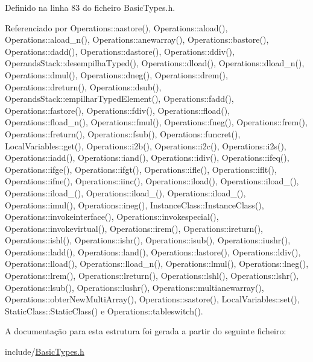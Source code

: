 Definido na linha 83 do ficheiro Basic\+Types.\+h.



Referenciado por Operations\+::aastore(), Operations\+::aload(), Operations\+::aload\+\_\+n(), Operations\+::anewarray(), Operations\+::bastore(), Operations\+::dadd(), Operations\+::dastore(), Operations\+::ddiv(), Operands\+Stack\+::desempilha\+Typed(), Operations\+::dload(), Operations\+::dload\+\_\+n(), Operations\+::dmul(), Operations\+::dneg(), Operations\+::drem(), Operations\+::dreturn(), Operations\+::dsub(), Operands\+Stack\+::empilhar\+Typed\+Element(), Operations\+::fadd(), Operations\+::fastore(), Operations\+::fdiv(), Operations\+::fload(), Operations\+::fload\+\_\+n(), Operations\+::fmul(), Operations\+::fneg(), Operations\+::frem(), Operations\+::freturn(), Operations\+::fsub(), Operations\+::funcret(), Local\+Variables\+::get(), Operations\+::i2b(), Operations\+::i2c(), Operations\+::i2s(), Operations\+::iadd(), Operations\+::iand(), Operations\+::idiv(), Operations\+::ifeq(), Operations\+::ifge(), Operations\+::ifgt(), Operations\+::ifle(), Operations\+::iflt(), Operations\+::ifne(), Operations\+::iinc(), Operations\+::iload(), Operations\+::iload\+\_(), Operations\+::iload\+\_(), Operations\+::iload\+\_(), Operations\+::iload\+\_(), Operations\+::imul(), Operations\+::ineg(), Instance\+Class\+::\+Instance\+Class(), Operations\+::invokeinterface(), Operations\+::invokespecial(), Operations\+::invokevirtual(), Operations\+::irem(), Operations\+::ireturn(), Operations\+::ishl(), Operations\+::ishr(), Operations\+::isub(), Operations\+::iushr(), Operations\+::ladd(), Operations\+::land(), Operations\+::lastore(), Operations\+::ldiv(), Operations\+::lload(), Operations\+::lload\+\_\+n(), Operations\+::lmul(), Operations\+::lneg(), Operations\+::lrem(), Operations\+::lreturn(), Operations\+::lshl(), Operations\+::lshr(), Operations\+::lsub(), Operations\+::lushr(), Operations\+::multianewarray(), Operations\+::obter\+New\+Multi\+Array(), Operations\+::sastore(), Local\+Variables\+::set(), Static\+Class\+::\+Static\+Class() e Operations\+::tableswitch().



A documentação para esta estrutura foi gerada a partir do seguinte ficheiro\+:\begin{DoxyCompactItemize}
\item 
include/\hyperlink{BasicTypes_8h}{Basic\+Types.\+h}\end{DoxyCompactItemize}
